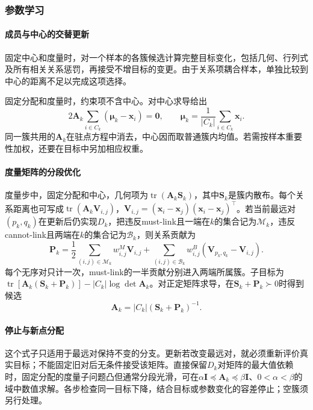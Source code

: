 \subsubsection{参数学习}

\paragraph{成员与中心的交替更新}

固定中心和度量时，对一个样本的各簇候选计算完整目标变化，包括几何、行列式及所有相关关系惩罚，再接受不增目标的变更。由于关系项耦合样本，单独比较到中心的距离不足以完成这项选择。

固定分配和度量时，约束项不含中心。对中心求导给出
\[
 2\bm{A}_k\sum_{i\in C_k}(\bm{\mu}_k-\bm{x}_i)=\bm{0},
 \qquad
 \bm{\mu}_k=\frac{1}{|C_k|}\sum_{i\in C_k}\bm{x}_i.
\]
同一簇共用的$\bm{A}_k$在驻点方程中消去，中心因而取普通簇内均值。若需按样本重要性加权，还要在目标中另加相应权重。

\paragraph{度量矩阵的分段优化}

度量步中，固定分配和中心，几何项为$\operatorname{tr}(\bm A_k\bm S_k)$，其中$\bm S_k$是簇内散布。每个关系距离也可写成$\operatorname{tr}(\bm A_k\bm V_{i,j})$，$\bm V_{i,j}=(\bm x_i-\bm x_j)(\bm x_i-\bm x_j)^\top$。若当前最远对$(p_k,q_k)$在更新后仍实现$D_k$，把违反must-link且一端在$k$的集合记为$\mathcal M_k$，违反cannot-link且两端在$k$的集合记为$\mathcal B_k$，则关系贡献为
\[
 \bm P_k=\frac12\sum_{(i,j)\in\mathcal M_k}w_{i,j}^M\bm V_{i,j}
 +\sum_{(i,j)\in\mathcal B_k}w_{i,j}^B
 (\bm V_{p_k,q_k}-\bm V_{i,j}).
\]
每个无序对只计一次，must-link的一半贡献分别进入两端所属簇。子目标为$\operatorname{tr}[\bm A_k(\bm S_k+\bm P_k)]-|C_k|\log\det\bm A_k$。对正定矩阵求导，在$\bm S_k+\bm P_k\succ0$时得到候选
\begin{equation}
 \bm A_k=|C_k|(\bm S_k+\bm P_k)^{-1}.
 \label{eq:clustering-mpck-metric}
\end{equation}
\paragraph{停止与新点分配}

这个式子只适用于最远对保持不变的分支。更新若改变最远对，就必须重新评价真实目标；不能固定旧对后无条件接受该矩阵。直接保留$D_k$对矩阵的最大值依赖时，固定分配的度量子问题凸但通常分段光滑，可在$\alpha\bm I\preceq\bm A_k\preceq\beta\bm I$、$0<\alpha<\beta$的域中数值求解。各步检查同一目标下降，结合目标或参数变化的容差停止；空簇须另行处理。

